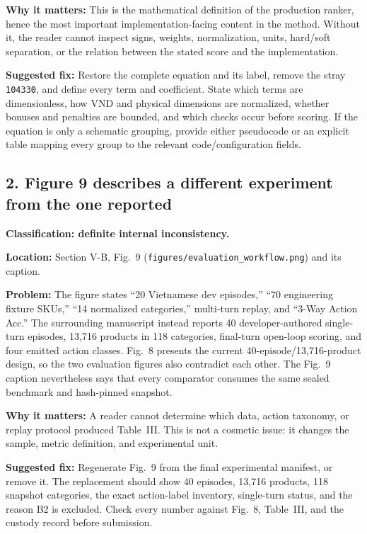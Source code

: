 \documentclass[11pt]{article}
\begin{document}
\textbf{Why it matters:} This is the mathematical definition of the production ranker, hence the most important implementation-facing content in the method.  Without it, the reader cannot inspect signs, weights, normalization, units, hard/soft separation, or the relation between the stated score and the implementation.

\textbf{Suggested fix:} Restore the complete equation and its label, remove the stray \texttt{104330}, and define every term and coefficient.  State which terms are dimensionless, how VND and physical dimensions are normalized, whether bonuses and penalties are bounded, and which checks occur before scoring.  If the equation is only a schematic grouping, provide either pseudocode or an explicit table mapping every group to the relevant code/configuration fields.

\subsection*{2. Figure 9 describes a different experiment from the one reported}

\textbf{Classification: definite internal inconsistency.}

\textbf{Location:} Section V-B, Fig.~9 (\texttt{figures/evaluation\_workflow.png}) and its caption.

\textbf{Problem:} The figure states ``20 Vietnamese dev episodes,'' ``70 engineering fixture SKUs,'' ``14 normalized categories,'' multi-turn replay, and ``3-Way Action Acc.''  The surrounding manuscript instead reports 40 developer-authored single-turn episodes, 13{,}716 products in 118 categories, final-turn open-loop scoring, and four emitted action classes.  Fig.~8 presents the current 40-episode/13{,}716-product design, so the two evaluation figures also contradict each other.  The Fig.~9 caption nevertheless says that every comparator consumes the same sealed benchmark and hash-pinned snapshot.

\textbf{Why it matters:} A reader cannot determine which data, action taxonomy, or replay protocol produced Table~III.  This is not a cosmetic issue: it changes the sample, metric definition, and experimental unit.

\textbf{Suggested fix:} Regenerate Fig.~9 from the final experimental manifest, or remove it.  The replacement should show 40 episodes, 13{,}716 products, 118 snapshot categories, the exact action-label inventory, single-turn status, and the reason B2 is excluded.  Check every number against Fig.~8, Table~III, and the custody record before submission.
\end{document}
